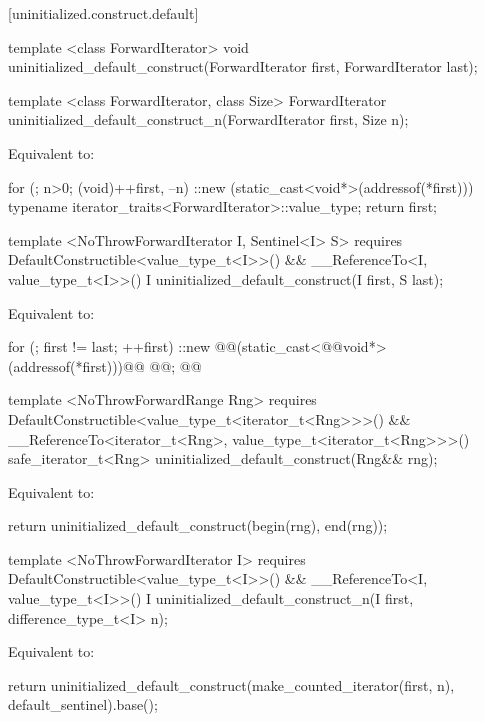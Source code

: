 [uninitialized.construct.default]{}
{\color{remclr}
\begin{codeblock}
template <class ForwardIterator>
  void uninitialized_default_construct(ForwardIterator first, ForwardIterator last);
\end{codeblock}

\begin{codeblock}
template <class ForwardIterator, class Size>
  ForwardIterator uninitialized_default_construct_n(ForwardIterator first, Size n);
\end{codeblock}

\setcounter{Paras}{1}
\pnum
\effects Equivalent to:
\begin{codeblock}
        for (; n>0; (void)++first, --n)
          ::new (static_cast<void*>(addressof(*first)))
            typename iterator_traits<ForwardIterator>::value_type;
        return first;
\end{codeblock}
} %

{\color{addclr}
\begin{codeblock}
template <NoThrowForwardIterator I, Sentinel<I> S>
  requires DefaultConstructible<value_type_t<I>>() &&
           __ReferenceTo<I, value_type_t<I>>()
    I uninitialized_default_construct(I first, S last);
\end{codeblock}
} %

\setcounter{Paras}{0}
\pnum
\effects Equivalent to:
\begin{codeblock}
        for (; first != last; ++first)
          ::new @@(static_cast<@@void*>(addressof(*first)))@\added{)}@
            @@;
        @@
\end{codeblock}

{\color{addclr}
\begin{codeblock}
  template <NoThrowForwardRange Rng>
    requires DefaultConstructible<value_type_t<iterator_t<Rng>>>() &&
             __ReferenceTo<iterator_t<Rng>, value_type_t<iterator_t<Rng>>>()
  safe_iterator_t<Rng>
  uninitialized_default_construct(Rng&& rng);
\end{codeblock}

\pnum
\effects Equivalent to:
\begin{codeblock}
        return uninitialized_default_construct(begin(rng), end(rng));
\end{codeblock}

\begin{codeblock}
template <NoThrowForwardIterator I>
  requires DefaultConstructible<value_type_t<I>>() &&
           __ReferenceTo<I, value_type_t<I>>()
    I uninitialized_default_construct_n(I first, difference_type_t<I> n);
\end{codeblock}

\pnum
\effects Equivalent to:
\begin{codeblock}
        return uninitialized_default_construct(make_counted_iterator(first, n),
                                               default_sentinel{}).base();
\end{codeblock}
} %

